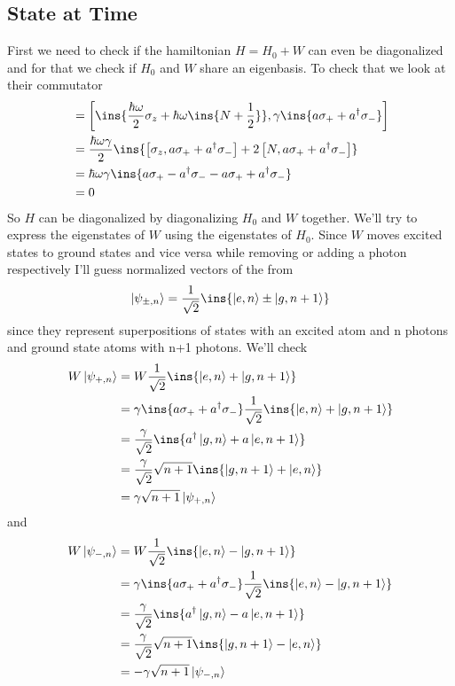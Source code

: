 \subsection{State at Time}
First we need to check if the hamiltonian $H=H_0+W$ can even be diagonalized and for that we check if $H_0$ and $W$ share an eigenbasis. To check that we look at their commutator
\begin{align}
    [H_0,W] &= \left[\ins{\frac{\hbar\omega}{2}\sigma_z+\hbar\omega\ins{N+\frac{1}{2}}},\gamma\ins{a\sigma_++a^\dagger\sigma_-}\right]\\
    &= \frac{\hbar\omega\gamma}{2}\ins{\left[\sigma_z,a\sigma_++a^\dagger\sigma_-\right]+2\left[N,a\sigma_++a^\dagger\sigma_-\right]}\\
    &= \hbar\omega\gamma\ins{a\sigma_+-a^\dagger\sigma_--a\sigma_++a^\dagger\sigma_-}\\
    &= 0
\end{align}
So $H$ can be diagonalized by diagonalizing $H_0$ and $W$ together. We'll try to express the eigenstates of $W$ using the eigenstates of $H_0$. Since $W$ moves excited states to ground states and vice versa while removing or adding a photon respectively I'll guess normalized vectors of the from
\begin{equation}
    \ket{\psi_{\pm,n}}=\frac{1}{\sqrt{2}}\ins{\ket{e,n}\pm\ket{g,n+1}}
\end{equation}
since they represent superpositions of states with an excited atom and n photons and ground state atoms with n+1 photons. We'll check
\begin{align}
    W\ket{\psi_{+,n}} &= W\frac{1}{\sqrt{2}}\ins{\ket{e,n}+\ket{g,n+1}}\\
    &= \gamma\ins{a\sigma_++a^\dagger\sigma_-}\frac{1}{\sqrt{2}}\ins{\ket{e,n}+\ket{g,n+1}}\\
    &= \frac{\gamma}{\sqrt{2}}\ins{a^\dagger\ket{g,n}+a\ket{e,n+1}}\\
    &= \frac{\gamma}{\sqrt{2}}\sqrt{n+1}\ins{\ket{g,n+1}+\ket{e,n}}\\
    &= \gamma\sqrt{n+1}\ket{\psi_{+,n}}
\end{align}
and
\begin{align}
    W\ket{\psi_{-,n}} &= W\frac{1}{\sqrt{2}}\ins{\ket{e,n}-\ket{g,n+1}}\\
    &= \gamma\ins{a\sigma_++a^\dagger\sigma_-}\frac{1}{\sqrt{2}}\ins{\ket{e,n}-\ket{g,n+1}}\\
    &= \frac{\gamma}{\sqrt{2}}\ins{a^\dagger\ket{g,n}-a\ket{e,n+1}}\\
    &= \frac{\gamma}{\sqrt{2}}\sqrt{n+1}\ins{\ket{g,n+1}-\ket{e,n}}\\
    &= -\gamma\sqrt{n+1}\ket{\psi_{-,n}}
\end{align}
